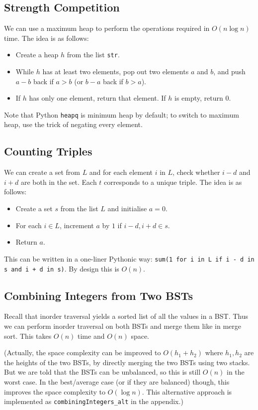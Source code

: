 \documentclass[12pt]{article}
\renewcommand{\t}{\texttt}
\begin{document}
\subsection{Strength Competition}
We can use a maximum heap to perform the operations required in $O(n\log n)$ time. The idea is as follows:
\begin{itemize}
    \item Create a heap $h$ from the list \t{str}.
    \item While $h$ has at least two elements, pop out two elements $a$ and $b$, and push $a-b$ back if $a>b$ (or $b-a$ back if $b>a$).
    \item If $h$ has only one element, return that element. If $h$ is empty, return $0$.
\end{itemize}
Note that Python \t{heapq} is minimum heap by default; to switch to maximum heap, use the trick of negating every element.
\subsection{Counting Triples}
We can create a set from $L$ and for each element $i$ in $L$, check whether $i-d$ and $i+d$ are both in the set. Each $t$ corresponds to a unique triple. The idea is as follows:
\begin{itemize}
    \item Create a set $s$ from the list $L$ and initialise $a=0$.
    \item For each $i\in L$, increment $a$ by $1$ if $i-d,i+d\in s$.
    \item Return $a$.
\end{itemize}
This can be written in a one-liner Pythonic way: \t{sum(1 for i in L if i - d in s and i + d in s)}. By design this is $O(n)$.
\subsection{Combining Integers from Two BSTs}
Recall that inorder traversal yields a sorted list of all the values in a BST. Thus we can perform inorder traversal on both BSTs and merge them like in merge sort. This takes $O(n)$ time and $O(n)$ space.

(Actually, the space complexity can be improved to $O\left(h_1+h_2\right)$ where $h_1, h_2$ are the heights of the two BSTs, by directly merging the two BSTs using two stacks. But we are told that the BSTs can be unbalanced, so this is still $O(n)$ in the worst case. In the best/average case (or if they are balanced) though, this improves the space complexity to $O(\log n)$. This alternative approach is implemented as \t{combiningIntegers\_alt} in the appendix.)
\end{document}
